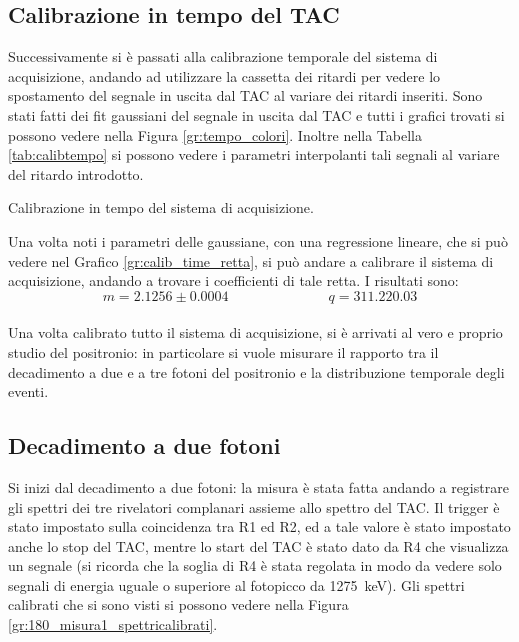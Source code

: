 \subsection{Calibrazione in tempo del TAC}

Successivamente si è passati alla calibrazione temporale del sistema di acquisizione, andando ad utilizzare la cassetta dei ritardi per vedere lo spostamento del
segnale in uscita dal TAC al variare dei ritardi inseriti. Sono stati fatti dei fit gaussiani del segnale in uscita dal TAC e tutti i grafici trovati si possono
vedere nella Figura \ref{gr:tempo_colori}. Inoltre nella Tabella \ref{tab:calibtempo} si possono vedere i parametri interpolanti tali segnali
al variare del ritardo introdotto.\\

\begin{table}[h]
	\centering
	
	\caption{Calibrazione in tempo del sistema di acquisizione.}
	\label{tab:calibtempo}
\end{table}

Una volta noti i parametri delle gaussiane, con una regressione lineare, che si può vedere nel Grafico \ref{gr:calib_time_retta}, si può andare a calibrare il sistema di
acquisizione, andando a trovare i coefficienti di tale retta. I risultati sono:
$$ m= 2.1256 \pm 0.0004 \hspace{3cm} q = 311.22 0.03$$\\



Una volta calibrato tutto il sistema di acquisizione, si è arrivati al vero e proprio studio del positronio: in particolare si vuole misurare il rapporto tra il decadimento
a due e a tre fotoni del positronio e la distribuzione temporale degli eventi.\\

\FloatBarrier
\subsection{Decadimento a due fotoni}

Si inizi dal decadimento a due fotoni: la misura è stata fatta andando a registrare gli spettri dei tre rivelatori complanari assieme allo spettro del TAC. Il
trigger è stato impostato sulla coincidenza tra R1 ed R2, ed a tale valore è stato impostato anche lo stop del TAC, mentre lo start del TAC è stato dato da R4 che visualizza
un segnale (si ricorda che la soglia di R4 è stata regolata in modo da vedere solo segnali di energia uguale o superiore al fotopicco da 1275~keV). Gli spettri calibrati che
si sono visti si possono vedere nella Figura \ref{gr:180_misura1_spettricalibrati}.\\


